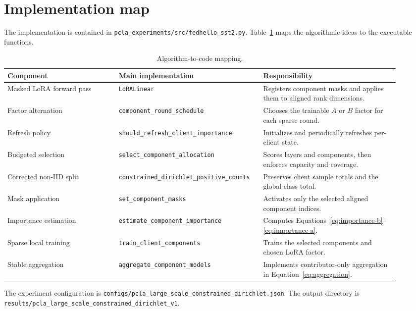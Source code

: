 \documentclass[11pt,a4paper]{article}
\begin{document}
\section{Implementation map}

The implementation is contained in
\texttt{pcla\_experiments/src/fedhello\_sst2.py}. Table~\ref{tab:impl} maps the
algorithmic ideas to the executable functions.

\begin{table}[htbp]
\centering
\caption{Algorithm-to-code mapping.}
\label{tab:impl}
\small
\begin{tabular}{>{\raggedright\arraybackslash}p{0.27\linewidth}
                >{\raggedright\arraybackslash}p{0.32\linewidth}
                >{\raggedright\arraybackslash}p{0.33\linewidth}}
\toprule
Component & Main implementation & Responsibility\\
\midrule
Masked LoRA forward pass
& \texttt{LoRALinear}
& Registers component masks and applies them to aligned rank dimensions.\\
Factor alternation
& \texttt{component\_round\_schedule}
& Chooses the trainable $A$ or $B$ factor for each sparse round.\\
Refresh policy
& \texttt{should\_refresh\_client\_importance}
& Initializes and periodically refreshes per-client state.\\
Budgeted selection
& \texttt{select\_component\_allocation}
& Scores layers and components, then enforces capacity and coverage.\\
Corrected non-IID split
& \texttt{constrained\_dirichlet\_positive\_counts}
& Preserves client sample totals and the global class total.\\
Mask application
& \texttt{set\_component\_masks}
& Activates only the selected aligned component indices.\\
Importance estimation
& \texttt{estimate\_component\_importance}
& Computes Equations~\ref{eq:importance-b}--\ref{eq:importance-a}.\\
Sparse local training
& \texttt{train\_client\_components}
& Trains the selected components and chosen LoRA factor.\\
Stable aggregation
& \texttt{aggregate\_component\_models}
& Implements contributor-only aggregation in Equation~\ref{eq:aggregation}.\\
\bottomrule
\end{tabular}
\end{table}

The experiment configuration is
\texttt{configs/pcla\_large\_scale\_constrained\_dirichlet.json}. The output
directory is
\texttt{results/pcla\_large\_scale\_constrained\_dirichlet\_v1}.
\end{document}
